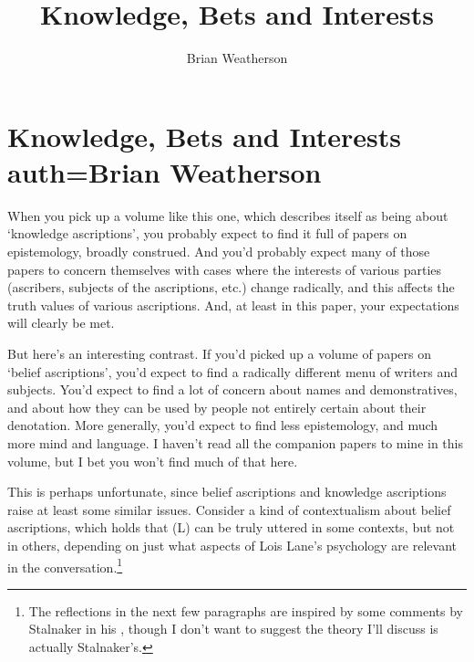 \documentclass[11pt,oneside]{book}
\title{Knowledge, Bets and Interests}
\author{Brian Weatherson}
\begin{document}



\setcounter{paper}{0}

\chapter[Knowledge, Bets and Interests]{Knowledge, Bets and Interests auth=Brian Weatherson}

\renewcommand{\thefootnote}{\fnsymbol{footnote}}
\renewcommand{\thefootnote}{\arabic{footnote}} 

When you pick up a volume like this one, which describes itself as being about `knowledge ascriptions', you probably expect to find it full of papers on epistemology, broadly construed. And you'd probably expect many of those papers to concern themselves with cases where the interests of various parties (ascribers, subjects of the ascriptions, etc.) change radically, and this affects the truth values of various ascriptions. And, at least in this paper, your expectations will clearly be met.

But here's an interesting contrast. If you'd picked up a volume of papers on `belief ascriptions', you'd expect to find a radically different menu of writers and subjects. You'd expect to find a lot of concern about names and demonstratives, and about how they can be used by people not entirely certain about their denotation. More generally, you'd expect to find less epistemology, and much more mind and language. I haven't read all the companion papers to mine in this volume, but I bet you won't find much of that here.

This is perhaps unfortunate, since belief ascriptions and knowledge ascriptions raise at least some similar issues. Consider a kind of contextualism about belief ascriptions, which holds that (L) can be truly uttered in some contexts, but not in others, depending on just what aspects of Lois Lane's psychology are relevant in the conversation.\footnote{The reflections in the next few paragraphs are inspired by some comments by Stalnaker in his \citeyearpar{Stalnaker2008}, though I don't want to suggest the theory I'll discuss is actually Stalnaker's.}
\end{document}
